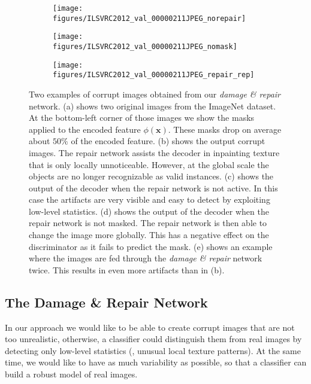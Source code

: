 \documentclass[10pt,twocolumn,letterpaper]{article}
\begin{document}
\begin{figure}[t]
\begin{center}
\begin{subfigure}[h]{0.195\linewidth}
	\texttt{[image: figures/ILSVRC2012\_val\_00000211JPEG\_norepair]}%
        \caption{}
\end{subfigure}\hspace{.4mm}%
\begin{subfigure}[h]{0.195\linewidth}
	\texttt{[image: figures/ILSVRC2012\_val\_00000211JPEG\_nomask]}%
        \caption{}
\end{subfigure}\hspace{.4mm}%
\begin{subfigure}[h]{0.195\linewidth}
	\texttt{[image: figures/ILSVRC2012\_val\_00000211JPEG\_repair\_rep]}%
        \caption{}
\end{subfigure}
\end{center}
   \caption{Two examples of corrupt images obtained from our \emph{damage \& repair} network. (a) shows two original images from the ImageNet dataset. At the bottom-left corner of those images we show the masks applied to the encoded feature $\phi(\mathbf{x})$. These masks drop on average about $50\%$ of the encoded feature. (b) shows the output corrupt images. The repair network assists the decoder in inpainting texture that is only locally unnoticeable. However, at the global scale the objects are no longer recognizable as valid instances. (c) shows the output of the decoder when the repair network is not active. In this case the artifacts are very visible and easy to detect by exploiting low-level statistics. (d) shows the output of the decoder when the repair network is not masked. The repair network is then able to change the image more globally. This has a negative effect on the discriminator as it fails to predict the mask. (e) shows an example where the images are fed through the \emph{damage \& repair} network twice. This results in even more artifacts than in (b).}
\label{fig:repair}
\end{figure}


\subsection{The Damage \& Repair Network}
\label{sec:repair}
In our approach we would like to be able to create corrupt images that are not too unrealistic, otherwise, a classifier could distinguish them from real images by detecting only low-level statistics (\eg, unusual local texture patterns). At the same time, we would like to have as much variability as possible, so that a classifier can build a robust model of real images.
\end{document}
